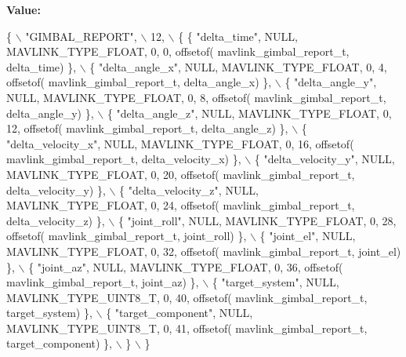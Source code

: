 {\bfseries Value\+:}
\begin{DoxyCode}
\{ \(\backslash\)
    \textcolor{stringliteral}{"GIMBAL\_REPORT"}, \(\backslash\)
    12, \(\backslash\)
    \{  \{ \textcolor{stringliteral}{"delta\_time"}, NULL, MAVLINK_TYPE_FLOAT, 0, 0, offsetof(
      mavlink_gimbal_report_t, delta\_time) \}, \(\backslash\)
         \{ \textcolor{stringliteral}{"delta\_angle\_x"}, NULL, MAVLINK_TYPE_FLOAT, 0, 4, offsetof(
      mavlink_gimbal_report_t, delta\_angle\_x) \}, \(\backslash\)
         \{ \textcolor{stringliteral}{"delta\_angle\_y"}, NULL, MAVLINK_TYPE_FLOAT, 0, 8, offsetof(
      mavlink_gimbal_report_t, delta\_angle\_y) \}, \(\backslash\)
         \{ \textcolor{stringliteral}{"delta\_angle\_z"}, NULL, MAVLINK_TYPE_FLOAT, 0, 12, offsetof(
      mavlink_gimbal_report_t, delta\_angle\_z) \}, \(\backslash\)
         \{ \textcolor{stringliteral}{"delta\_velocity\_x"}, NULL, MAVLINK_TYPE_FLOAT, 0, 16, offsetof(
      mavlink_gimbal_report_t, delta\_velocity\_x) \}, \(\backslash\)
         \{ \textcolor{stringliteral}{"delta\_velocity\_y"}, NULL, MAVLINK_TYPE_FLOAT, 0, 20, offsetof(
      mavlink_gimbal_report_t, delta\_velocity\_y) \}, \(\backslash\)
         \{ \textcolor{stringliteral}{"delta\_velocity\_z"}, NULL, MAVLINK_TYPE_FLOAT, 0, 24, offsetof(
      mavlink_gimbal_report_t, delta\_velocity\_z) \}, \(\backslash\)
         \{ \textcolor{stringliteral}{"joint\_roll"}, NULL, MAVLINK_TYPE_FLOAT, 0, 28, offsetof(
      mavlink_gimbal_report_t, joint\_roll) \}, \(\backslash\)
         \{ \textcolor{stringliteral}{"joint\_el"}, NULL, MAVLINK_TYPE_FLOAT, 0, 32, offsetof(
      mavlink_gimbal_report_t, joint\_el) \}, \(\backslash\)
         \{ \textcolor{stringliteral}{"joint\_az"}, NULL, MAVLINK_TYPE_FLOAT, 0, 36, offsetof(
      mavlink_gimbal_report_t, joint\_az) \}, \(\backslash\)
         \{ \textcolor{stringliteral}{"target\_system"}, NULL, MAVLINK_TYPE_UINT8_T, 0, 40, offsetof(
      mavlink_gimbal_report_t, target\_system) \}, \(\backslash\)
         \{ \textcolor{stringliteral}{"target\_component"}, NULL, MAVLINK_TYPE_UINT8_T, 0, 41, offsetof(
      mavlink_gimbal_report_t, target\_component) \}, \(\backslash\)
         \} \(\backslash\)
\}
\end{DoxyCode}
\mbox{\label{mavlink__msg__gimbal__report_8h_ab0c239cd21f8da7f78221187458248e4}} 
